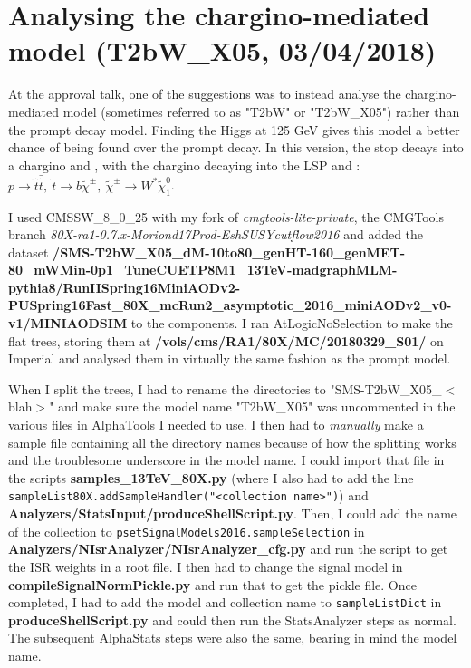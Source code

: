 \section{Analysing the chargino-mediated model (T2bW\_X05, 03/04/2018)}

At the approval talk, one of the suggestions was to instead analyse the chargino-mediated model (sometimes referred to as "T2bW" or "T2bW\_X05") rather than the prompt decay model. Finding the Higgs at 125 GeV gives this model a better chance of being found over the prompt decay. In this version, the stop decays into a chargino and \Pqb, with the chargino decaying into the LSP and \PW: $p \rightarrow \tilde{t} \bar{\tilde{t}}, \ \tilde{t} \rightarrow b\tilde{\chi}^{\pm}, \ \tilde{\chi}^{\pm} \rightarrow W^* \tilde{\chi}_1^0$.

I used CMSSW\_8\_0\_25 with my fork of \emph{cmgtools-lite-private}, the CMGTools branch \emph{80X-ra1-0.7.x-Moriond17Prod-EshSUSYcutflow2016} and added the dataset \textbf{/SMS-T2bW\_X05\_dM-10to80\_genHT-160\_genMET-80\_mWMin-0p1\_TuneCUETP8M1\_13TeV-madgraphMLM-pythia8/RunIISpring16MiniAODv2-PUSpring16Fast\_80X\_mcRun2\_asymptotic\_2016\_miniAODv2\_v0-v1/MINIAODSIM} to the components. I ran AtLogicNoSelection to make the flat trees, storing them at \textbf{/vols/cms/RA1/80X/MC/20180329\_S01/} on Imperial and analysed them in virtually the same fashion as the prompt model.

When I split the trees, I had to rename the directories to "SMS-T2bW\_X05\_$<$blah$>$" and make sure the model name "T2bW\_X05" was uncommented in the various files in AlphaTools I needed to use. I then had to \emph{manually} make a sample file containing all the directory names because of how the splitting works and the troublesome underscore in the model name. I could import that file in the scripts \textbf{samples\_13TeV\_80X.py} (where I also had to add the line \texttt{sampleList80X.addSampleHandler("<collection name>")}) and \textbf{Analyzers/StatsInput/produceShellScript.py}. Then, I could add the name of the collection to \texttt{psetSignalModels2016.sampleSelection} in \textbf{Analyzers/NIsrAnalyzer/NIsrAnalyzer\_cfg.py} and run the script to get the ISR weights in a root file. I then had to change the signal model in \textbf{compileSignalNormPickle.py} and run that to get the pickle file. Once completed, I had to add the model and collection name to \texttt{sampleListDict} in \textbf{produceShellScript.py} and could then run the StatsAnalyzer steps as normal. The subsequent AlphaStats steps were also the same, bearing in mind the model name.

